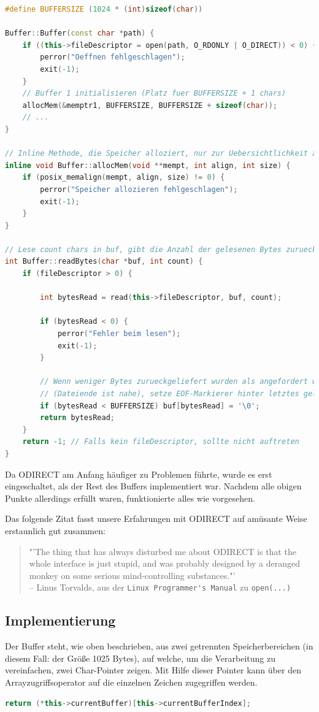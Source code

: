 \documentclass[listof=totoc,DIV11,a4paper]{scrreprt}
\newcommand{\od}{O\textunderscore DIRECT }
\begin{document}
\begin{lstlisting}[language=C++,label=lst:bufferinit,caption=Buffer: Initialisierung und Lesen aus Datei]
#define BUFFERSIZE (1024 * (int)sizeof(char))

Buffer::Buffer(const char *path) {
    if ((this->fileDescriptor = open(path, O_RDONLY | O_DIRECT)) < 0) {
		perror("Oeffnen fehlgeschlagen");
		exit(-1);
	}
	// Buffer 1 initialisieren (Platz fuer BUFFERSIZE + 1 chars)
	allocMem(&memptr1, BUFFERSIZE, BUFFERSIZE + sizeof(char));
	// ...
}

// Inline Methode, die Speicher alloziert, nur zur Uebersichtlichkeit ausgelagert.
inline void Buffer::allocMem(void **mempt, int align, int size) {
	if (posix_memalign(mempt, align, size) != 0) {
		perror("Speicher allozieren fehlgeschlagen");
		exit(-1);
	}
}

// Lese count chars in buf, gibt die Anzahl der gelesenen Bytes zurueck
int Buffer::readBytes(char *buf, int count) {
	if (fileDescriptor > 0) {

		int bytesRead = read(this->fileDescriptor, buf, count);

		if (bytesRead < 0) {
			perror("Fehler beim lesen");
			exit(-1);
		}

		// Wenn weniger Bytes zurueckgeliefert wurden als angefordert wurden
		// (Dateiende ist nahe), setze EOF-Markierer hinter letztes gelesenen char
		if (bytesRead < BUFFERSIZE) buf[bytesRead] = '\0';
		return bytesRead;
	}
	return -1; // Falls kein fileDescriptor, sollte nicht auftreten
}
\end{lstlisting}

Da \od am Anfang häufiger zu Problemen führte, wurde es erst eingeschaltet, als der Rest des Buffers implementiert war. Nachdem alle obigen Punkte allerdings erfüllt waren, funktionierte alles wie vorgesehen.

Das folgende Zitat fasst unsere Erfahrungen mit \od auf amüsante Weise erstaunlich gut zusammen:

\begin{quotation}
"'The thing that has always disturbed me about \od is that the whole interface is just stupid, and was probably designed by a deranged monkey on some serious mind-controlling substances."'\\\hspace*{1em}-- Linus Torvalds, aus der \verb+Linux Programmer's Manual+ zu \verb+open(...)+
\end{quotation}

\subsection{Implementierung}
Der Buffer steht, wie oben beschrieben, aus zwei getrennten Speicherbereichen (in diesem Fall: der Größe 1025 Bytes), auf welche, um die Verarbeitung zu vereinfachen, zwei Char-Pointer zeigen. Mit Hilfe dieser Pointer kann über den Arrayzugriffsoperator auf die einzelnen Zeichen zugegriffen werden.
\begin{lstlisting}[language=C++]
return (*this->currentBuffer)[this->currentBufferIndex];
\end{lstlisting}
\end{document}
